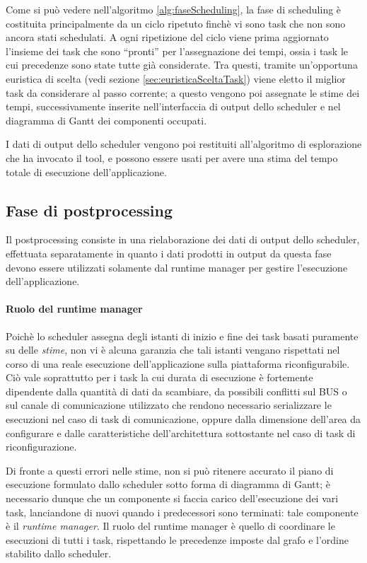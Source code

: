 Come si può vedere nell'algoritmo \ref{alg:faseScheduling}, la fase di 
scheduling è costituita principalmente da un ciclo ripetuto finchè vi sono 
task che non sono ancora stati schedulati. A ogni ripetizione del ciclo viene 
prima aggiornato l'insieme dei task che sono ``pronti'' per l'assegnazione dei 
tempi, ossia i task le cui precedenze sono state tutte già considerate. Tra 
questi, tramite un'opportuna euristica di scelta (vedi sezione 
\ref{sec:euristicaSceltaTask}) viene eletto il miglior task da considerare al 
passo corrente; a questo vengono poi assegnate le stime dei tempi, 
successivamente inserite nell'interfaccia di output dello scheduler e nel 
diagramma di Gantt dei componenti occupati.

I dati di output dello scheduler vengono poi restituiti all'algoritmo di 
esplorazione che ha invocato il tool, e possono essere usati per avere una 
stima del tempo totale di esecuzione dell'applicazione.


\subsection{Fase di postprocessing}
Il postprocessing consiste in una rielaborazione dei dati di output dello 
scheduler, effettuata separatamente in quanto i dati prodotti in output da 
questa fase devono essere utilizzati solamente dal runtime manager per gestire 
l'esecuzione dell'applicazione.

\paragraph{Ruolo del runtime manager}
Poichè lo scheduler assegna degli istanti di inizio e fine dei task basati 
puramente su delle \emph{stime}, non vi è alcuna garanzia che tali istanti 
vengano rispettati nel corso di una reale esecuzione dell'applicazione sulla 
piattaforma riconfigurabile. Ciò vale soprattutto per i task la cui
durata di esecuzione è fortemente dipendente dalla quantità di dati da 
scambiare, da possibili conflitti sul BUS o sul canale di comunicazione 
utilizzato che rendono necessario serializzare le esecuzioni nel caso di 
task di comunicazione, oppure dalla dimensione dell'area da configurare e 
dalle caratteristiche dell'architettura sottostante nel caso di task di 
riconfigurazione.

Di fronte a questi errori nelle stime, non si può ritenere accurato il piano di 
esecuzione formulato dallo scheduler sotto forma di diagramma di Gantt; è 
necessario dunque che un componente si faccia carico dell'esecuzione dei vari 
task, lanciandone di nuovi quando i predecessori sono terminati: tale 
componente è il \emph{runtime manager}. Il ruolo del runtime manager è quello 
di coordinare le esecuzioni di tutti i task, rispettando le precedenze imposte 
dal grafo e l'ordine stabilito dallo scheduler.

